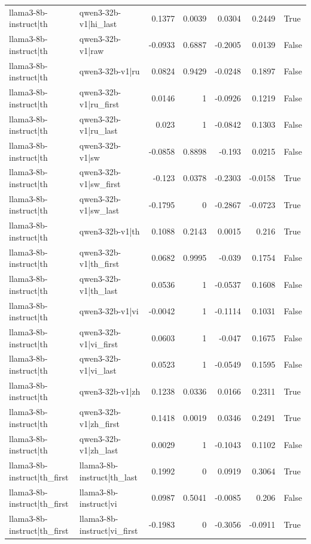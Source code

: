 \begin{table}
\begin{tabular}{l l r r r r l}
llama3-8b-instruct|th & qwen3-32b-v1|hi_last & 0.1377 & 0.0039 & 0.0304 & 0.2449 & True \\
llama3-8b-instruct|th & qwen3-32b-v1|raw & -0.0933 & 0.6887 & -0.2005 & 0.0139 & False \\
llama3-8b-instruct|th & qwen3-32b-v1|ru & 0.0824 & 0.9429 & -0.0248 & 0.1897 & False \\
llama3-8b-instruct|th & qwen3-32b-v1|ru_first & 0.0146 & 1 & -0.0926 & 0.1219 & False \\
llama3-8b-instruct|th & qwen3-32b-v1|ru_last & 0.023 & 1 & -0.0842 & 0.1303 & False \\
llama3-8b-instruct|th & qwen3-32b-v1|sw & -0.0858 & 0.8898 & -0.193 & 0.0215 & False \\
llama3-8b-instruct|th & qwen3-32b-v1|sw_first & -0.123 & 0.0378 & -0.2303 & -0.0158 & True \\
llama3-8b-instruct|th & qwen3-32b-v1|sw_last & -0.1795 & 0 & -0.2867 & -0.0723 & True \\
llama3-8b-instruct|th & qwen3-32b-v1|th & 0.1088 & 0.2143 & 0.0015 & 0.216 & True \\
llama3-8b-instruct|th & qwen3-32b-v1|th_first & 0.0682 & 0.9995 & -0.039 & 0.1754 & False \\
llama3-8b-instruct|th & qwen3-32b-v1|th_last & 0.0536 & 1 & -0.0537 & 0.1608 & False \\
llama3-8b-instruct|th & qwen3-32b-v1|vi & -0.0042 & 1 & -0.1114 & 0.1031 & False \\
llama3-8b-instruct|th & qwen3-32b-v1|vi_first & 0.0603 & 1 & -0.047 & 0.1675 & False \\
llama3-8b-instruct|th & qwen3-32b-v1|vi_last & 0.0523 & 1 & -0.0549 & 0.1595 & False \\
llama3-8b-instruct|th & qwen3-32b-v1|zh & 0.1238 & 0.0336 & 0.0166 & 0.2311 & True \\
llama3-8b-instruct|th & qwen3-32b-v1|zh_first & 0.1418 & 0.0019 & 0.0346 & 0.2491 & True \\
llama3-8b-instruct|th & qwen3-32b-v1|zh_last & 0.0029 & 1 & -0.1043 & 0.1102 & False \\
llama3-8b-instruct|th_first & llama3-8b-instruct|th_last & 0.1992 & 0 & 0.0919 & 0.3064 & True \\
llama3-8b-instruct|th_first & llama3-8b-instruct|vi & 0.0987 & 0.5041 & -0.0085 & 0.206 & False \\
llama3-8b-instruct|th_first & llama3-8b-instruct|vi_first & -0.1983 & 0 & -0.3056 & -0.0911 & True \\

\end{tabular}
\end{table}
